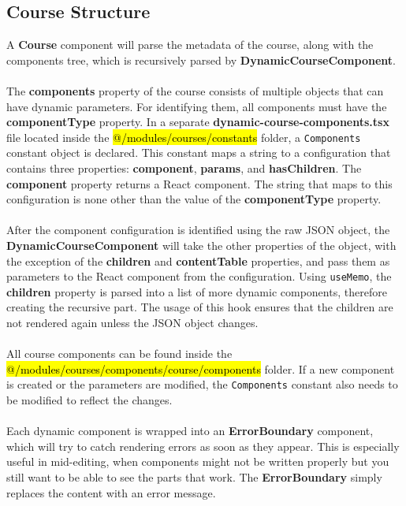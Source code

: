 \subsection{Course Structure}

\noindent A \textbf{Course} component will parse the metadata of the course, along with the components tree, which is recursively parsed by \textbf{DynamicCourseComponent}.
\\\\
\noindent The \textbf{components} property of the course consists of multiple objects that can have dynamic parameters. For identifying them, all components must have the \textbf{componentType} property. In a separate \textbf{dynamic-course-components.tsx} file located inside the \hl{@/modules/courses/constants} folder, a \texttt{Components} constant object is declared. This constant maps a string to a configuration that contains three properties: \textbf{component}, \textbf{params}, and \textbf{hasChildren}. The \textbf{component} property returns a React component. The string that maps to this configuration is none other than the value of the \textbf{componentType} property.
\\\\
\noindent After the component configuration is identified using the raw JSON object, the \textbf{DynamicCourseComponent} will take the other properties of the object, with the exception of the \textbf{children} and \textbf{contentTable} properties, and pass them as parameters to the React component from the configuration. Using \texttt{useMemo}, the \textbf{children} property is parsed into a list of more dynamic components, therefore creating the recursive part. The usage of this hook ensures that the children are not rendered again unless the JSON object changes.
\\\\
\noindent All course components can be found inside the \hl{@/modules/courses/components/course/components} folder. If a new component is created or the parameters are modified, the \texttt{Components} constant also needs to be modified to reflect the changes.
\\\\
\noindent Each dynamic component is wrapped into an \textbf{ErrorBoundary} component, which will try to catch rendering errors as soon as they appear. This is especially useful in mid-editing, when components might not be written properly but you still want to be able to see the parts that work. The \textbf{ErrorBoundary} simply replaces the content with an error message.

